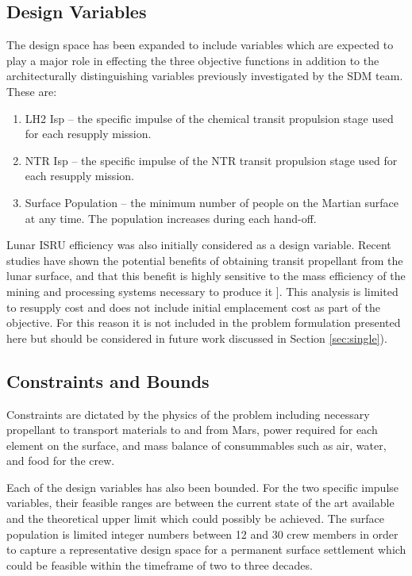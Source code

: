 \documentclass[]{aiaa-pretty}
\begin{document}
\subsection{Design Variables}
\label{sec:DVs}
The design space has been expanded to include variables which are expected to play a major role in effecting the three objective functions in addition to the architecturally distinguishing variables previously investigated by the SDM team. These are:
\begin{enumerate}
\item	LH2 Isp – the specific impulse of the chemical transit propulsion stage used for each resupply mission.
\item NTR Isp – the specific impulse of the NTR transit propulsion stage used for each resupply mission.
\item	Surface Population – the minimum number of people on the Martian surface at any time. The population increases during each hand-off.
\end{enumerate} 
Lunar ISRU efficiency was also initially considered as a design variable. Recent studies have shown the potential benefits of obtaining transit propellant from the lunar surface, and that this benefit is highly sensitive to the mass efficiency of the mining and processing systems necessary to produce it \cite{ho2014dynamic}]. This analysis is limited to resupply cost and does not include initial emplacement cost as part of the objective. For this reason it is not included in the problem formulation presented here but should be considered in future work discussed in Section \ref{sec:single}). 

\subsection{Constraints and Bounds}
\label{sec:constraints}
Constraints are dictated by the physics of the problem including necessary propellant to transport materials to and from Mars, power required for each element on the surface, and mass balance of consummables such as air, water, and food for the crew. 

Each of the design variables has also been bounded. For the two specific impulse variables, their feasible ranges are between the current state of the art available and the theoretical upper limit which could possibly be achieved. The surface population is limited integer numbers between 12 and 30 crew members in order to capture a representative design space for a permanent surface settlement which could be feasible within the timeframe of two to three decades.
\end{document}
